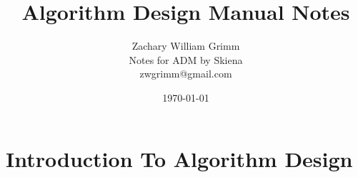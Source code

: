 \documentclass[10pt,letterpaper]{article}
\title{Algorithm Design Manual Notes}
\author{Zachary William Grimm\\
  \small{Notes  for ADM by Skiena}\\
  \small{zwgrimm@gmail.com}
}
\date{\today{}}
\begin{document}
\maketitle

\tableofcontents{}

\newpage{}


\section{Introduction To Algorithm Design}













% 
\end{document}
